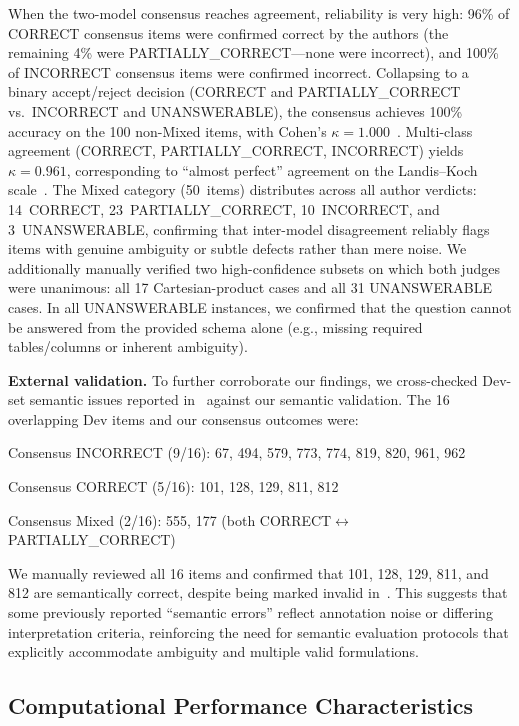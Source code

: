 \documentclass[print]{einformatica}
\begin{document}
When the two-model consensus reaches agreement, reliability is very high: 96\% of CORRECT consensus items were confirmed correct by the authors (the remaining 4\% were PARTIALLY\_CORRECT---none were incorrect), and 100\% of INCORRECT consensus items were confirmed incorrect. Collapsing to a binary accept/reject decision (CORRECT and PARTIALLY\_CORRECT vs.\ INCORRECT and UNANSWERABLE), the consensus achieves 100\% accuracy on the 100 non-Mixed items, with Cohen's $\kappa = 1.000$~\cite{cohen1960coefficient}. Multi-class agreement (CORRECT, PARTIALLY\_CORRECT, INCORRECT) yields $\kappa = 0.961$, corresponding to ``almost perfect'' agreement on the Landis--Koch scale~\cite{landis1977measurement}. The Mixed category (50~items) distributes across all author verdicts: 14~CORRECT, 23~PARTIALLY\_CORRECT, 10~INCORRECT, and 3~UNANSWERABLE, confirming that inter-model disagreement reliably flags items with genuine ambiguity or subtle defects rather than mere noise. We additionally manually verified two high-confidence subsets on which both judges were unanimous: all 17 Cartesian-product cases and all 31 UNANSWERABLE cases. In all UNANSWERABLE instances, we confirmed that the question cannot be answered from the provided schema alone (e.g., missing required tables/columns or inherent ambiguity).

\textbf{External validation.} To further corroborate our findings, we cross-checked Dev-set semantic issues reported in~\cite{liu2025nl2sqlbugs} against our semantic validation. The 16 overlapping Dev items and our consensus outcomes were:

Consensus INCORRECT (9/16): 67, 494, 579, 773, 774, 819, 820, 961, 962

Consensus CORRECT (5/16): 101, 128, 129, 811, 812

Consensus Mixed (2/16): 555, 177 (both CORRECT$\leftrightarrow$PARTIALLY\_CORRECT)

We manually reviewed all 16 items and confirmed that 101, 128, 129, 811, and 812 are semantically correct, despite being marked invalid in~\cite{liu2025nl2sqlbugs}. This suggests that some previously reported ``semantic errors'' reflect annotation noise or differing interpretation criteria, reinforcing the need for semantic evaluation protocols that explicitly accommodate ambiguity and multiple valid formulations.

\subsection{Computational Performance Characteristics}\label{sec:performance}
\end{document}
